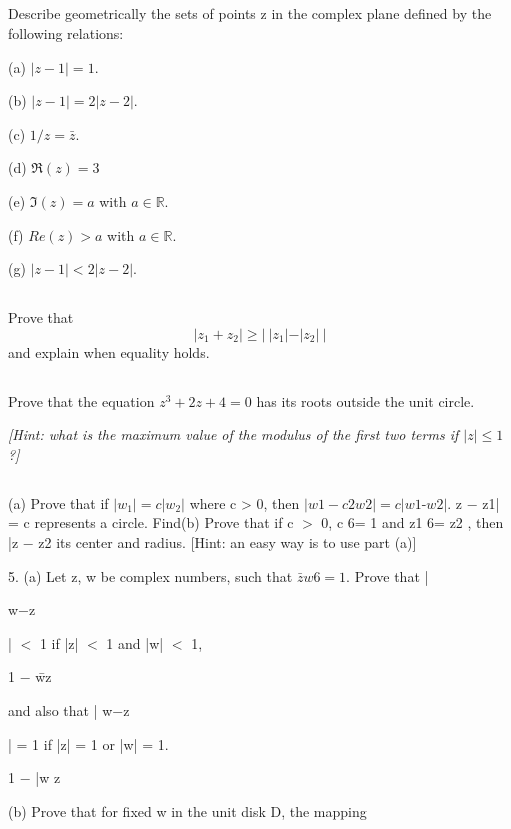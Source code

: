 
\subsection{}

Describe geometrically the sets of points z in the complex plane defined by the following relations:

(a) $|z - 1| = 1$.

(b) $|z - 1| = 2|z - 2|$.

(c) $1/z = \bar z$.

(d) $\Re(z) = 3$

(e) $\Im(z) = a$ with $a \in \mathbb{R}$.

(f) $Re(z) > a$ with $a \in \mathbb R$.

(g) $|z - 1| < 2|z - 2|$.\subsection{}
Prove that $$|z_1 + z_2 | \geq |~|z_1 | - |z_2 |~|$$ and explain when equality holds.

\subsection{}
Prove that the equation $z^3 + 2z + 4 = 0$ has its roots outside the unit circle. 

\textit{[Hint: what is the maximum value of the modulus of the first two terms if $|z| \leq 1$?]}

\subsection{}

(a) Prove that if $|w_1 | = c|w_2 |$ where c > 0, then 
$|w1- c2 w2 | = c|w1 $-$ w2 |$.
z $-$ z1| = c represents a circle. Find(b) Prove that if c $>$ 0, c 6= 1 and z1 6= z2 , then |z $-$ z2 its center and radius. 
[Hint: an easy way is to use part (a)]

5. (a) Let z, w be complex numbers, such that $\bar z w 6= 1$. 
Prove that
|

w$-$z

| $<$ 1 if |z| $<$ 1 and |w| $<$ 1,

1 $-$ w̄z

and also that
|
w$-$z

| = 1 if |z| = 1 or |w| = 1.

1 $-$ \bar w z

(b) Prove that for fixed w in the unit disk D, the mapping

